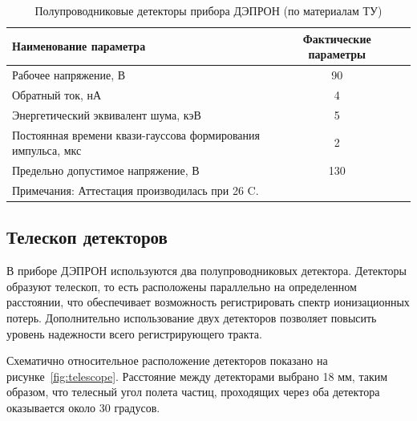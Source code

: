 \begin{table} 

	\begin{tabular}{p{10cm}|cc}
		Наименование параметра                                       & Фактические параметры &  \\ \hline
		Рабочее напряжение, В                                        &          90           &  \\
		Обратный ток, нА                                             &           4           &  \\
		Энергетический эквивалент шума, кэВ                          &           5           &  \\
		Постоянная времени квази-гауссова формирования импульса, мкс &           2           &  \\
		Предельно допустимое напряжение, В                           &          130          &  \\
		\multicolumn{2}{l}{Примечания: Аттестация производилась при 26 C.}                   &
	\end{tabular} 
	\caption{Полупроводниковые детекторы прибора ДЭПРОН (по материалам ТУ)}
		\label{tab:detectors}
\end{table}



\subsection{Телескоп детекторов}
В приборе ДЭПРОН используются два полупроводниковых детектора. Детекторы образуют телескоп, то есть расположены параллельно на определенном расстоянии, что обеспечивает возможность регистрировать спектр ионизационных потерь.
Дополнительно использование двух детекторов позволяет повысить уровень надежности всего регистрирующего тракта.

Схематично относительное расположение детекторов показано на рисунке~\ref{fig:telescope}.  Расстояние между детекторами выбрано 18 мм, таким образом, что телесный угол полета частиц, проходящих через оба детектора оказывается около 30 градусов. 





